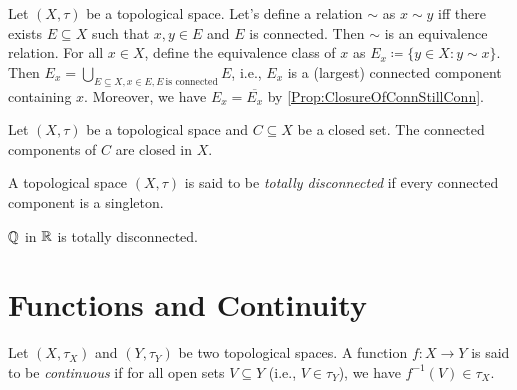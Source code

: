 \documentclass[screen]{techreport}
\numberwithin{equation}{section}
\begin{document}
\begin{definition}\label{De:ConnEquivalenceRelation}
	Let $(X,\tau)$ be a topological space.
	Let's define a relation ${\sim}$ as $x \sim y$ iff there exists $E \subseteq X$ such that $x,y\in E$ and $E$ is connected.
	Then ${\sim}$ is an equivalence relation.
	For all $x \in X$, define the equivalence class of $x$ as $E_x \coloneqq \{ y \in X : y \sim x \}$.
	Then $E_x = \bigcup_{E \subseteq X, x \in E, E~\text{is connected}} E$, i.e., $E_x$ is a (largest) connected component containing $x$.
	Moreover, we have $E_x = \overline{E_x}$ by \cref{Prop:ClosureOfConnStillConn}.
\end{definition}

\begin{proposition}\label{Prop:ClosedConnComponentStillClosed}
	Let $(X,\tau)$ be a topological space and $C \subseteq X$ be a closed set.
	The connected components of $C$ are closed in $X$.
\end{proposition}

\begin{definition}\label{De:TotalDisconnectedness}
	A topological space $(X,\tau)$ is said to be \emph{totally disconnected} if every connected component is a singleton.
\end{definition}

\begin{example}\label{De:QInRIsTotallyDisconn}
	$\mathbb{Q}$ in $\mathbb{R}$ is totally disconnected.
\end{example}

\section{Functions and Continuity}

\begin{definition}\label{De:ContinuousFunctions}
	Let $(X,\tau_X)$ and $(Y,\tau_Y)$ be two topological spaces.
	A function $f : X \to Y$ is said to be \emph{continuous} if for all open sets $V \subseteq Y$ (i.e., $V \in \tau_Y$), we have $f^{-1}(V) \in \tau_X$.
\end{definition}
\end{document}
